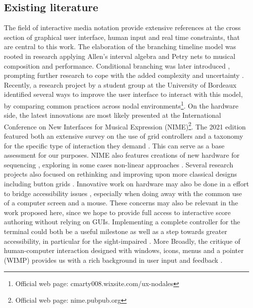 \documentclass[journal,onecolumn]{IEEEtran}
\begin{document}

\subsection{Existing literature}
The field of interactive media notation \cite{ircam:antescofo}\cite{buzzing:iannix}\cite{grame:inscore} provide extensive references at the cross section of graphical user interface, human input and real time constraints, that are central to this work. 
The elaboration of the branching timeline model was rooted in research applying Allen's interval algebra \cite{allombert:constraint} and Petry nets \cite{allombert:petri} to musical composition and performance. Conditional branching was later introduced \cite{toro:condition}, prompting further research to cope with the added complexity and uncertainty \cite{arias:colour}. Recently, a research project by a student group at the University of Bordeaux identified several ways to improve the user interface to interact with this model, by comparing common practices across nodal environments\footnote{Official web page: cmarty008.wixsite.com/ux-nodales}. On the hardware side, the latest innovations are most likely presented at the International Conference on New Interfaces for Musical Expression (NIME)\footnote{Official web page: nime.pubpub.org}. The 2021 edition featured both an extensive survey on the use of grid controllers \cite{rossmy:grid} and a taxonomy for the specific type of interaction they demand \cite{pust:taxonomy}. This can serve as a base assessment for our purposes. 
NIME also features creations of new hardware for sequencing \cite{arellano:radear}, exploring in some cases non-linear approaches \cite{hayes:neurohedron}. Several research projects also focused on rethinking and improving upon more classical designs \cite{snyder:jd} including button grids \cite{rossmy:touch}. Innovative work on hardware may also be done in a effort to bridge accessibility issues \cite{forester:loopblocks}\cite{vetter:tangible}, especially when doing away with the common use of a computer screen and a mouse. These concerns may also be relevant in the work proposed here, since we hope to provide full access to interactive score authoring without relying on GUIs. Implementing a complete controller for the terminal could both be a useful milestone as well as a step towards greater accessibility, in particular for the sight-impaired \cite{payne:blind}. More Broadly, the critique of human-computer interaction designed with windows, icons, menus and a pointer (WIMP) provides us with a rich background in user input and feedback \cite{baudouin:instrumental}\cite{beaudouin:interaction}. 
\end{document}

